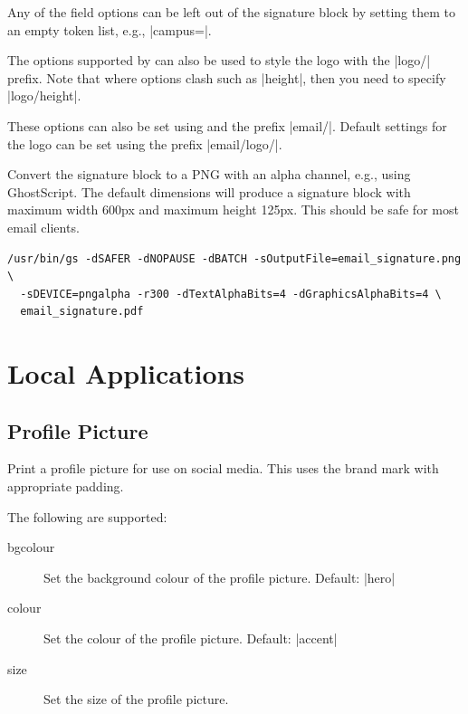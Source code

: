 \documentclass[a4paper]{l3doc}
\begin{document}
Any of the field options can be left out of the signature block by setting
them to an empty token list, e.g., |campus=|.

The options supported by  can also be used to style the logo
with the |logo/| prefix. Note that where options clash such as |height|, then
you need to specify |logo/height|.

These options can also be set using  and the prefix
|email/|. Default settings for the logo can be set using the prefix
|email/logo/|.

Convert the signature block to a PNG with an alpha channel, e.g., using
GhostScript. The default dimensions will produce a signature block with
maximum width 600px and maximum height 125px. This should be safe for most
email clients.

\begin{lstlisting}
/usr/bin/gs -dSAFER -dNOPAUSE -dBATCH -sOutputFile=email_signature.png \
  -sDEVICE=pngalpha -r300 -dTextAlphaBits=4 -dGraphicsAlphaBits=4 \
  email_signature.pdf
\end{lstlisting}

\section{Local Applications}

\subsection{Profile Picture}

\begin{function}{\AFESBrandProfile}
  \begin{syntax}
  \end{syntax}
  Print a profile picture for use on social media. This uses the brand mark
  with appropriate padding.
\end{function}

\AFESBrandProfile[size=1.5cm]

The following  are supported:

\begin{description}
  \item[bgcolour] Set the background colour of the profile picture. Default:
    |hero|
  \item[colour] Set the colour of the profile picture. Default: |accent|
  \item[size] Set the size of the profile picture.
\end{description}
\end{document}
